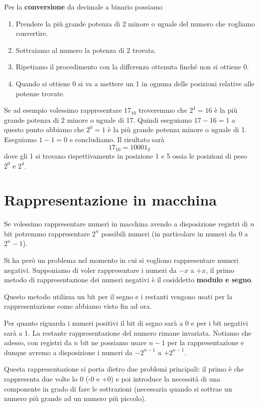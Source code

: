 Per la \textbf{conversione} da decimale a binario possiamo
\begin{enumerate}
	\item Prendere la più grande potenza di 2 minore o uguale del numero che vogliamo convertire.
	\item Sottraiamo al numero la potenza di 2 trovata.
	\item Ripetiamo il procedimento con la differenza ottenuta finché non si ottiene 0.
	\item Quando si ottiene 0 si va a mettere un 1 in ognuna delle posizioni relative alle potenze
	      trovate.
\end{enumerate}
Se ad esempio volessimo rappresentare $17_{10}$ troveremmo che $2^4 = 16$ è la più grande potenza
di 2 minore o uguale di 17. Quindi eseguiamo $17 - 16 = 1$ a questo punto abbiamo che $2^0 = 1$ è
la più grande potenza minore o uguale di 1. Eseguiamo $1-1 = 0$ e concludiamo. Il risultato sarà
\[ 17_{10} = 10001_2 \]
dove gli 1 si trovano rispettivamente in posizione 1 e 5 ossia le posizioni di peso $2^0$ e $2^4$.

\section{Rappresentazione in macchina}
Se volessimo rappresentare numeri in macchina avendo a disposizione registri di $n$ bit potremmo
rappresentare $2^n$ possibili numeri (in particolare in numeri da 0 a $2^n - 1$).

Si ha però un problema nel momento in cui si vogliono rappresentare numeri negativi. Supponiamo di
voler rappresentare i numeri da $-x$ a $+x$, il primo metodo di rappresentazione dei numeri
negativi è il cosiddetto \textbf{modulo e segno}.

Questo metodo utilizza un bit per il segno e i restanti vengono usati per la rappresentazione come
abbiamo visto fin ad ora.

Per quanto riguarda i numeri positivi il bit di segno sarà a 0 e per i bit negativi sarà a 1. La
restante rappresentazione del numero rimane invariata. Notiamo che adesso, con registri da $n$ bit
ne possiamo usare $n-1$ per la rappresentazione e dunque avremo a disposizione i numeri da
$-2^{n-1}$ a $+2^{n-1}$.

Questa rappresentazione si porta dietro due problemi principali: il primo è che rappresenta due
volte lo 0 (-0 e +0) e poi introduce la necessità di una componente in grado di fare le sottrazioni
(necessaria quando si sottrae un numero più grande ad un numero più piccolo).

